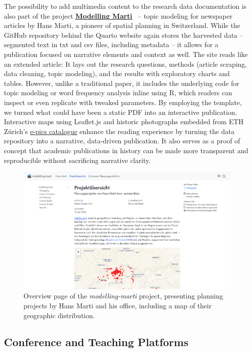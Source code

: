 \documentclass[final]{anthology-ch} %
\begin{document}
The possibility to add multimedia content to the research data documentation is also part of the project \href{https://mtwente.github.io/modelling-marti}{\textbf{Modelling Marti}}~\cite{twente2025b} -- topic modeling for newspaper articles by Hans Marti, a pioneer of spatial planning in Switzerland. While the GitHub repository behind the Quarto website again stores the harvested data -- segmented text in txt and csv files, including metadata -- it allows for a publication focused on narrative elements and context as well. The site reads like an extended article: It lays out the research questions, methods (article scraping, data cleaning, topic modeling), and the results with exploratory charts and tables. However, unlike a traditional paper, it includes the underlying code for topic modeling or word frequency analysis inline using R, which readers can inspect or even replicate with tweaked parameters. By employing the template, we turned what could have been a static PDF into an interactive publication. Interactive maps using Leaflet.js and historic photographs embedded from ETH Zürich's \href{https://e-pics3.ethz.ch/de/home/}{e-pics catalogue} enhance the reading experience by turning the data repository into a narrative, data-driven publication. It also serves as a proof of concept that academic publications in history can be made more transparent and reproducible without sacrificing narrative clarity.

\begin{figure}[t!]
  \centering
  \includegraphics[width=0.9\linewidth]{images/modelling_marti.png}
  \caption{Overview page of the \emph{modelling-marti} project, presenting planning projects by Hans Marti and his office, including a map of their geographic distribution.}
  \label{fig-modelling-marti}
\end{figure}

\subsection{Conference and Teaching Platforms}\label{conference-and-teaching-platforms}
\end{document}
